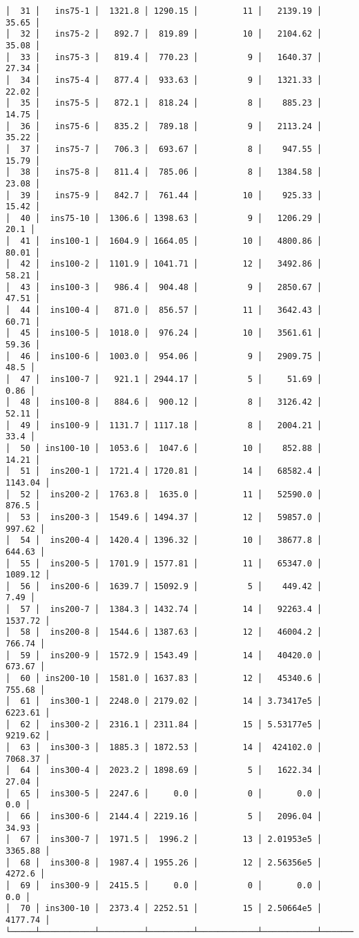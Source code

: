 \documentclass[12pt,a4paper]{article}
\begin{document}
\begin{lstlisting}
│  31 │   ins75-1 │  1321.8 │ 1290.15 │         11 │   2139.19 │   35.65 │
│  32 │   ins75-2 │   892.7 │  819.89 │         10 │   2104.62 │   35.08 │
│  33 │   ins75-3 │   819.4 │  770.23 │          9 │   1640.37 │   27.34 │
│  34 │   ins75-4 │   877.4 │  933.63 │          9 │   1321.33 │   22.02 │
│  35 │   ins75-5 │   872.1 │  818.24 │          8 │    885.23 │   14.75 │
│  36 │   ins75-6 │   835.2 │  789.18 │          9 │   2113.24 │   35.22 │
│  37 │   ins75-7 │   706.3 │  693.67 │          8 │    947.55 │   15.79 │
│  38 │   ins75-8 │   811.4 │  785.06 │          8 │   1384.58 │   23.08 │
│  39 │   ins75-9 │   842.7 │  761.44 │         10 │    925.33 │   15.42 │
│  40 │  ins75-10 │  1306.6 │ 1398.63 │          9 │   1206.29 │    20.1 │
│  41 │  ins100-1 │  1604.9 │ 1664.05 │         10 │   4800.86 │   80.01 │
│  42 │  ins100-2 │  1101.9 │ 1041.71 │         12 │   3492.86 │   58.21 │
│  43 │  ins100-3 │   986.4 │  904.48 │          9 │   2850.67 │   47.51 │
│  44 │  ins100-4 │   871.0 │  856.57 │         11 │   3642.43 │   60.71 │
│  45 │  ins100-5 │  1018.0 │  976.24 │         10 │   3561.61 │   59.36 │
│  46 │  ins100-6 │  1003.0 │  954.06 │          9 │   2909.75 │    48.5 │
│  47 │  ins100-7 │   921.1 │ 2944.17 │          5 │     51.69 │    0.86 │
│  48 │  ins100-8 │   884.6 │  900.12 │          8 │   3126.42 │   52.11 │
│  49 │  ins100-9 │  1131.7 │ 1117.18 │          8 │   2004.21 │    33.4 │
│  50 │ ins100-10 │  1053.6 │  1047.6 │         10 │    852.88 │   14.21 │
│  51 │  ins200-1 │  1721.4 │ 1720.81 │         14 │   68582.4 │ 1143.04 │
│  52 │  ins200-2 │  1763.8 │  1635.0 │         11 │   52590.0 │   876.5 │
│  53 │  ins200-3 │  1549.6 │ 1494.37 │         12 │   59857.0 │  997.62 │
│  54 │  ins200-4 │  1420.4 │ 1396.32 │         10 │   38677.8 │  644.63 │
│  55 │  ins200-5 │  1701.9 │ 1577.81 │         11 │   65347.0 │ 1089.12 │
│  56 │  ins200-6 │  1639.7 │ 15092.9 │          5 │    449.42 │    7.49 │
│  57 │  ins200-7 │  1384.3 │ 1432.74 │         14 │   92263.4 │ 1537.72 │
│  58 │  ins200-8 │  1544.6 │ 1387.63 │         12 │   46004.2 │  766.74 │
│  59 │  ins200-9 │  1572.9 │ 1543.49 │         14 │   40420.0 │  673.67 │
│  60 │ ins200-10 │  1581.0 │ 1637.83 │         12 │   45340.6 │  755.68 │
│  61 │  ins300-1 │  2248.0 │ 2179.02 │         14 │ 3.73417e5 │ 6223.61 │
│  62 │  ins300-2 │  2316.1 │ 2311.84 │         15 │ 5.53177e5 │ 9219.62 │
│  63 │  ins300-3 │  1885.3 │ 1872.53 │         14 │  424102.0 │ 7068.37 │
│  64 │  ins300-4 │  2023.2 │ 1898.69 │          5 │   1622.34 │   27.04 │
│  65 │  ins300-5 │  2247.6 │     0.0 │          0 │       0.0 │     0.0 │
│  66 │  ins300-6 │  2144.4 │ 2219.16 │          5 │   2096.04 │   34.93 │
│  67 │  ins300-7 │  1971.5 │  1996.2 │         13 │ 2.01953e5 │ 3365.88 │
│  68 │  ins300-8 │  1987.4 │ 1955.26 │         12 │ 2.56356e5 │  4272.6 │
│  69 │  ins300-9 │  2415.5 │     0.0 │          0 │       0.0 │     0.0 │
│  70 │ ins300-10 │  2373.4 │ 2252.51 │         15 │ 2.50664e5 │ 4177.74 │
└─────┴───────────┴─────────┴─────────┴────────────┴───────────┴─────────┘
\end{lstlisting}
\end{document}
